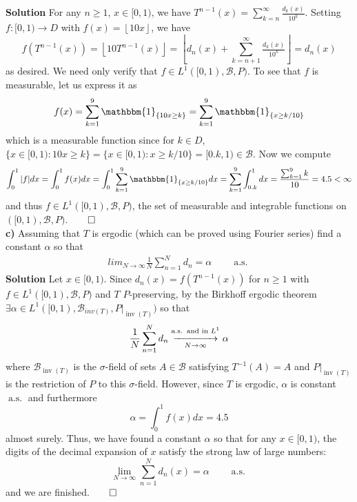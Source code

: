 \documentclass[10pt]{article}
\newcommand{\1}[1]{\mathbbm{1}_{#1}}
\newcommand{\mc}[1]{\mathcal{#1}}
\newcommand*{\floor}[1]{\left\lfloor#1\right\rfloor}
\DeclareMathOperator{\as}{a.s.}
\DeclareMathOperator{\inv}{inv}
\begin{document}
    {\bf Solution}\hspace{5pt} For any $n\geq 1$, $x\in[0,1)$, we have $T^{n-1}(x)=\sum_{k=n}^\infty\tfrac{d_k(x)}{10^k}$. Setting $f:[0,1)\rightarrow D$ with $f(x)=\floor{10x}$, we have
    \[f(T^{n-1}(x))=\floor{10T^{n-1}(x)}=\floor{d_n(x)+\sum_{k=n+1}^\infty\tfrac{d_k(x)}{10^k}}=d_n(x)\]
    as desired. We need only verify that $f\in L^1([0,1),\mc{B},P)$. To see that $f$ is measurable, let us express it as
    \begin{align*}
        f(x)=\sum_{k=1}^9\1{\{10x\geq k\}}=\sum_{k=1}^9\1{\{x\geq k/10\}}
    \end{align*}
    which is a measurable function since for $k\in D$, $\{x\in[0,1):10x\geq k\}=\{x\in[0,1):x\geq k/10\}=[0.k,1)\in\mc{B}$. Now we compute
    \begin{align*}
        \int_0^1|f|dx=\int_0^1f(x)dx=\int_0^1\sum_{k=1}^9\1{\{x\geq k/10\}}dx=\sum_{k=1}^9\int_{0.k}^1dx=\frac{\sum_{k=1}^9k}{10}=4.5<\infty
    \end{align*}
    and thus $f\in L^1([0,1),\mc{B},P)$, the set of measurable and integrable functions on $([0,1),\mc{B},P)$.\hfill{$\qed$}\\[5pt]
    {\bf c)}\hspace{5pt} Assuming that $T$ is ergodic (which can be proved using Fourier series) find a constant $\alpha$ so that 
    \begin{align*}
        lim_{N\rightarrow\infty}\frac{1}{N}\sum_{n=1}^Nd_n=\alpha\qquad\as
    \end{align*}
    {\bf Solution}\hspace{5pt} Let $x\in[0,1)$. Since $d_n(x)=f(T^{n-1}(x))$ for $n\geq 1$ with $f\in L^1([0,1),\mc{B},P)$ and $T$ $P$-preserving, by the Birkhoff ergodic theorem $\exists \alpha\in L^1([0,1),\mc{B}_{inv(T)},P|_{\inv(T)})$ so that
    \[\frac{1}{N}\sum_{n=1}^Nd_n\overunderset{\as\text{ and in $L^1$}}{N\rightarrow\infty}{\xrightarrow{\hspace*{40pt}}}\alpha\]
    where $\mc{B}_{\inv(T)}$ is the $\sigma$-field of sets $A\in\mc{B}$ satisfying $T^{-1}(A)=A$ and $P|_{\inv(T)}$ is the restriction of $P$ to this $\sigma$-field. However, since $T$ is ergodic, $\alpha$ is constant $\as$ and furthermore
    \[\alpha=\int_0^1f(x)dx=4.5\]
    almost surely. Thus, we have found a constant $\alpha$ so that for any $x\in[0,1)$, the digits of the decimal expansion of $x$ satisfy the strong law of large numbers:
    \[\lim_{N\rightarrow\infty}\sum_{n=1}^Nd_n(x)=\alpha\qquad\as\]
    and we are finished.\hfill{$\qed$}\\[5pt]
\end{document}
